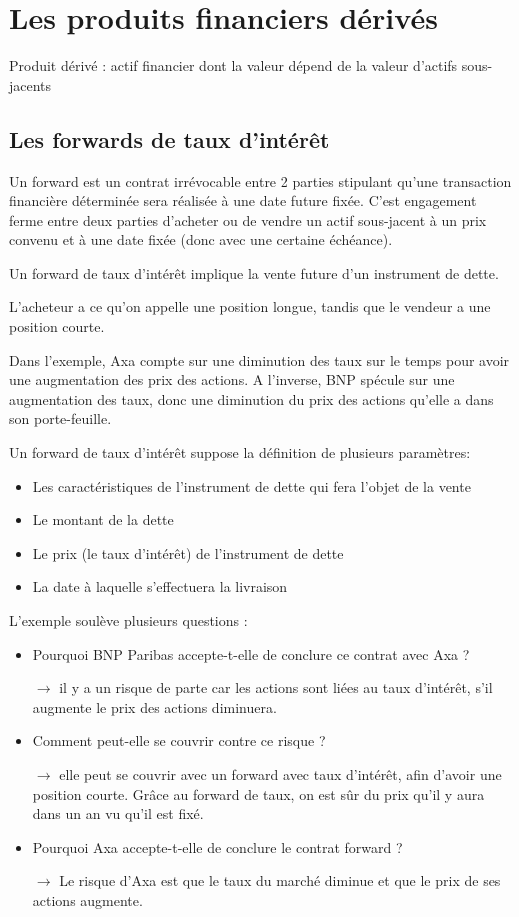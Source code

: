 \chapter{Les produits financiers dérivés}

Produit dérivé : actif financier dont la valeur dépend de la valeur d'actifs sous-jacents

\section{Les forwards de taux d'intérêt}

Un forward est un contrat irrévocable entre 2 parties stipulant qu'une transaction financière déterminée sera réalisée à une date future fixée. C'est engagement ferme entre deux parties d'acheter ou de vendre un actif sous-jacent à un prix convenu et à une date fixée (donc avec une certaine échéance).

Un forward de taux d'intérêt implique la vente future d'un instrument de dette.

L'acheteur a ce qu'on appelle une position longue, tandis que le vendeur a une position courte.

Dans l'exemple, Axa compte sur une diminution des taux sur le temps pour avoir une augmentation des prix des actions. A l'inverse, BNP spécule sur une augmentation des taux, donc une diminution du prix des actions qu'elle a dans son porte-feuille.

Un forward de taux d'intérêt suppose la définition de plusieurs paramètres: 
\begin{itemize}
	\item Les caractéristiques de l'instrument de dette qui fera l'objet de la vente 
	\item Le montant de la dette 
	\item Le prix (le taux d'intérêt) de l'instrument de dette 
	\item La date à laquelle s'effectuera la livraison
\end{itemize}

L'exemple soulève plusieurs questions :

\begin{itemize}
	\item Pourquoi BNP Paribas accepte-t-elle de conclure ce contrat avec Axa ? 
	\item[$\rightarrow$] il y a un risque de parte car les actions sont liées au taux d'intérêt, s'il augmente le prix des actions diminuera.
	\item Comment peut-elle se couvrir contre ce risque ?
	\item[$\rightarrow$] elle peut se couvrir avec un forward avec taux d'intérêt, afin d'avoir une position courte. Grâce au forward de taux, on est sûr du prix qu'il y aura dans un an vu qu'il est fixé.
	\item Pourquoi Axa accepte-t-elle de conclure le contrat forward ?
	\item[$\rightarrow$] Le risque d'Axa est que le taux du marché diminue et que le prix de ses actions augmente.
\end{itemize}


